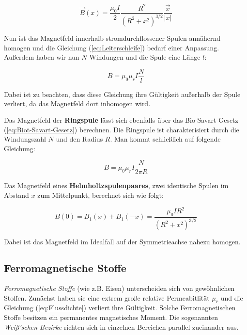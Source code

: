 \begin{equation} \label{eq:Leiterschleife}
    \vec{B}(x) = \frac{\mu_{0}I}{2} \frac{R^2}{(R^2 + x^2)^{3/2}} \frac{\vec{x}}{|x|}
\end{equation}

Nun ist das Magnetfeld innerhalb stromdurchflossener Spulen annähernd homogen und die Gleichung (\ref{eq:Leiterschleife}) bedarf einer Anpassung.
Außerdem haben wir nun $N$ Windungen und die Spule eine Länge $l$:

\begin{equation} \label{eq:LangeSpule}
    B = \mu_{0}\mu_{r}I \frac{N}{l}
\end{equation}

Dabei ist zu beachten, dass diese Gleichung ihre Gültigkeit außerhalb der Spule verliert, da das Magnetfeld dort inhomogen wird.

Das Magnetfeld der \textbf{Ringspule} lässt sich ebenfalls über das Bio-Savart Gesetz (\ref{eq:Biot-Savart-Gesetz}) berechnen.
Die Ringspule ist charakterisiert durch die Windungszahl $N$ und den Radius $R$.
Man kommt schließlich auf folgende Gleichung:

\begin{equation}
    B = \mu_{0}\mu_{r}I \frac{N}{2\pi R}
\end{equation}

Das Magnetfeld eines \textbf{Helmholtzspulenpaares}, zwei identische Spulen im Abstand $x$ zum Mittelpunkt, berechnet sich wie folgt:

\begin{equation} \label{eq:Helmholtzgleichung}
    B(0) =  B_{1}(x) +  B_{1}(-x) = \frac {\mu_{0} I R^2} {(R^2 + x^2)^{3/2}}
\end{equation}

Dabei ist das Magnetfeld im Idealfall auf der Symmetrieachse nahezu homogen.


\subsection{Ferromagnetische Stoffe}

\textit{Ferromagnetische Stoffe} (wie z.B. Eisen) unterscheiden sich von gewöhnlichen Stoffen.
Zunächst haben sie eine extrem große relative Permeabitlität $\mu_{r}$ und die Gleichung (\ref{eq:Flussdichte}) verliert ihre Gültigkeit.
Solche Ferromagnetischen Stoffe besitzen ein permanentes magnetisches Moment.
Die sogenannten \textit{Weiß'schen Bezirke} richten sich in einzelnen Bereichen parallel zueinander aus.

